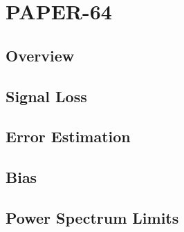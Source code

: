 \chapter{PAPER-64}
\label{c.PSA64}


\section{Overview}

\section{Signal Loss}

\section{Error Estimation}

\section{Bias}

\section{Power Spectrum Limits}






